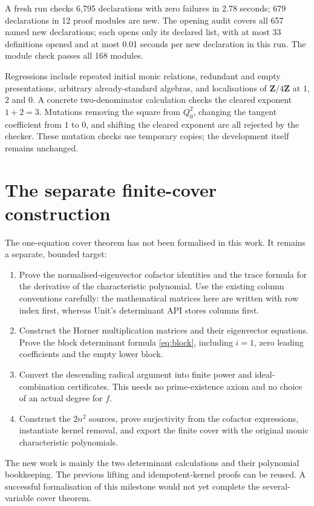 \documentclass[11pt]{article}
\begin{document}
A fresh run checks 6,795 declarations with zero failures in 2.78 seconds;
679 declarations in 12 proof modules are new. The opening audit covers
all 657 named new declarations; each opens only its declared list,
with at most 33 definitions opened and at most 0.01 seconds per new
declaration in this run. The module check passes all 168 modules.

Regressions include repeated initial monic relations, redundant and
empty presentations, arbitrary already-standard algebras, and
localisations of $\mathbf Z/4\mathbf Z$ at $1$, $2$ and $0$.
A concrete two-denominator calculation checks the cleared exponent
$1+2=3$. Mutations removing the square from $Q_0^2$, changing the
tangent coefficient from $1$ to $0$, and shifting the cleared exponent
are all rejected by the checker. These mutation checks use temporary
copies; the development itself remains unchanged.

\section{The separate finite-cover construction}

The one-equation cover theorem has not been formalised in this work.
It remains a separate, bounded target:
\begin{enumerate}
\item Prove the normalised-eigenvector cofactor identities and the
trace formula for the derivative of the characteristic polynomial.
Use the existing column conventions carefully: the mathematical
matrices here are written with row index first, whereas Unit's
determinant API stores columns first.
\item Construct the Horner multiplication matrices and their
eigenvector equations. Prove the block determinant formula
\eqref{eq:block}, including $i=1$, zero leading coefficients and
the empty lower block.
\item Convert the descending radical argument into finite power and
ideal-combination certificates. This needs no prime-existence axiom
and no choice of an actual degree for $f$.
\item Construct the $2n^2$ sources, prove surjectivity from the
cofactor expressions, instantiate kernel removal, and export the
finite cover with the original monic characteristic polynomials.
\end{enumerate}

The new work is mainly the two determinant calculations and their
polynomial bookkeeping. The previous lifting and idempotent-kernel
proofs can be reused. A successful formalisation of this milestone
would not yet complete the several-variable cover theorem.
\end{document}
